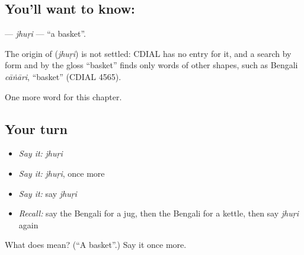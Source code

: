 \subsection*{You'll want to know: }
\textbf{} — \emph{jhuṛi} — \textquotedblleft{}a basket\textquotedblright{}.

\begin{cousinweb}
The origin of \textbf{} (\emph{jhuṛi}) is not settled: CDIAL has no entry for it, and a search by form and by the gloss \textquotedblleft{}basket\textquotedblright{} finds only words of other shapes, such as Bengali \emph{cāṅāri}, \textquotedblleft{}basket\textquotedblright{} (CDIAL 4565).
\end{cousinweb}

\begin{grammarlens}[title={What you've built}]
One more word for this chapter.
\end{grammarlens}

\subsection*{Your turn}
\begin{itemize}
\raggedright
  \item \emph{Say it:} \emph{jhuṛi}
  \item \emph{Say it:} \emph{jhuṛi}, once more
  \item \emph{Say it:} say \emph{jhuṛi}
  \item \emph{Recall:} say the Bengali for a jug, then the Bengali for a kettle, then say \emph{jhuṛi} again
\end{itemize}

\begin{tcolorbox}[breakable,colback=teal!4,colframe=teal!35!black,title={Before you move on}]
What does  mean? (\textquotedblleft{}A basket\textquotedblright{}.) Say it once more.
\end{tcolorbox}
